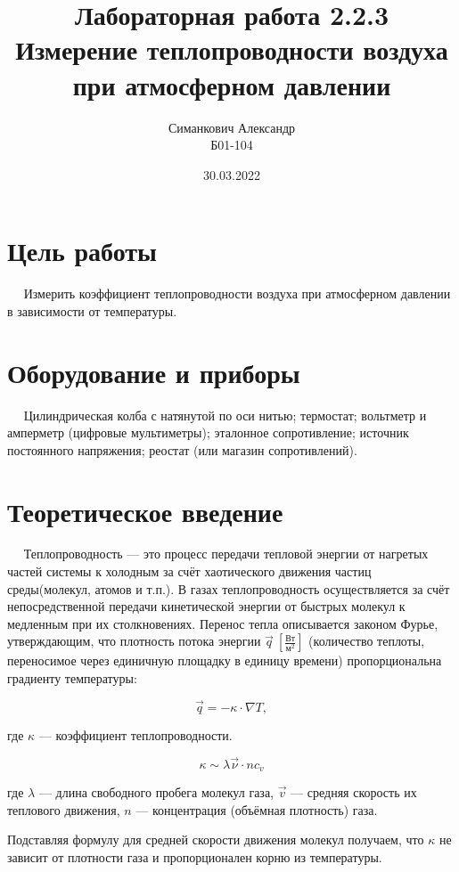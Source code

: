 \documentclass[12pt,a4paper]{article}
\title{Лабораторная работа 2.2.3\\ Измерение теплопроводности воздуха при атмосферном давлении}
\author{Симанкович Александр \\ Б01-104}
\date{30.03.2022}
\begin{document}
	\maketitle
	
	\section*{Цель работы}
		
	$\quad$ Измерить коэффициент теплопроводности воздуха при атмосферном давлении в зависимости от температуры.
	
	\section*{Оборудование и приборы} 
	$\quad$ Цилиндрическая колба с натянутой по оси нитью;
	термостат; 
	вольтметр и амперметр (цифровые мультиметры); 
	эталонное сопротивление; источник постоянного напряжения; 
	реостат (или магазин сопротивлений).
	
	\section*{Теоретическое введение}
	
	$\quad$ Теплопроводность — это процесс передачи тепловой энергии от нагретых частей системы к холодным за счёт хаотического движения частиц среды(молекул, атомов и т.п.).
	В газах теплопроводность осуществляется за счёт непосредственной передачи кинетической энергии от быстрых молекул к медленным при их столкновениях. 
	Перенос тепла описывается законом Фурье, утверждающим, что плотность потока энергии $\vec{q} \: [\frac{\text{Вт}}{\text{м}^{2}}]$ (количество теплоты, переносимое через единичную площадку в единицу времени) пропорциональна градиенту температуры:
	
	\begin{equation*}
		\vec{q} = -\kappa \cdot \nabla T,
	\end{equation*}
	
	где $\kappa$ — коэффициент теплопроводности.
	
	\begin{equation*}
		\kappa \sim \lambda \vec{\nu} \cdot n c_v
	\end{equation*}
	
	где $\lambda$  — длина свободного пробега молекул газа, $\vec{v}$ — средняя скорость их теплового движения, $n$ — концентрация (объёмная плотность) газа.
	
	Подставляя формулу для средней скорости движения молекул получаем, что $\kappa$ не зависит от плотности газа и пропорционален корню из температуры.
	
\end{document}
